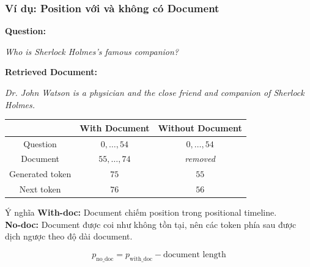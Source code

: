 \begin{frame}
    \frametitle{Ví dụ: Position với và không có Document}

    \small

    \textbf{Question:}

    \textit{Who is Sherlock Holmes's famous companion?}

    \vspace{0.15cm}

    \textbf{Retrieved Document:}

    \textit{Dr. John Watson is a physician and the close friend
    and companion of Sherlock Holmes.}

    \vspace{0.2cm}

    \begin{center}
    \begin{tabular}{c|c|c}
        \toprule
        & \textbf{With Document} & \textbf{Without Document} \\
        \midrule

        Question
        & $0,\ldots,54$
        & $0,\ldots,54$
        \\

        Document
        & $55,\ldots,74$
        & \textit{removed}
        \\

        Generated token
        & $75$
        & $55$
        \\

        Next token
        & $76$
        & $56$
        \\

        \bottomrule
    \end{tabular}
    \end{center}

    \vspace{0.2cm}

    \begin{block}{Ý nghĩa}
        \centering
        \textbf{With-doc:} Document chiếm position trong positional timeline.\\[2pt]
        \textbf{No-doc:} Document được coi như không tồn tại,
        nên các token phía sau được dịch ngược theo độ dài document.
    \end{block}

    \vspace{0.1cm}

    \begin{center}
        \[
            p_{\mathrm{no\_doc}}
            =
            p_{\mathrm{with\_doc}}
            -
            \text{document length}
        \]
    \end{center}

\end{frame}


